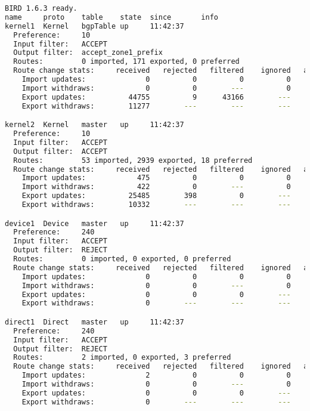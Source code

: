 \begin{lstlisting}[language=bash, caption={Birdc4 show protocols all}]
BIRD 1.6.3 ready.
name     proto    table    state  since       info
kernel1  Kernel   bgpTable up     11:42:37
  Preference:     10
  Input filter:   ACCEPT
  Output filter:  accept_zone1_prefix
  Routes:         0 imported, 171 exported, 0 preferred
  Route change stats:     received   rejected   filtered    ignored   accepted
    Import updates:              0          0          0          0          0
    Import withdraws:            0          0        ---          0          0
    Export updates:          44755          9      43166        ---       1580
    Export withdraws:        11277        ---        ---        ---        414

kernel2  Kernel   master   up     11:42:37
  Preference:     10
  Input filter:   ACCEPT
  Output filter:  ACCEPT
  Routes:         53 imported, 2939 exported, 18 preferred
  Route change stats:     received   rejected   filtered    ignored   accepted
    Import updates:            475          0          0          0        475
    Import withdraws:          422          0        ---          0        422
    Export updates:          25485        398          0        ---      25087
    Export withdraws:        10332        ---        ---        ---      10155

device1  Device   master   up     11:42:37
  Preference:     240
  Input filter:   ACCEPT
  Output filter:  REJECT
  Routes:         0 imported, 0 exported, 0 preferred
  Route change stats:     received   rejected   filtered    ignored   accepted
    Import updates:              0          0          0          0          0
    Import withdraws:            0          0        ---          0          0
    Export updates:              0          0          0        ---          0
    Export withdraws:            0        ---        ---        ---          0

direct1  Direct   master   up     11:42:37
  Preference:     240
  Input filter:   ACCEPT
  Output filter:  REJECT
  Routes:         2 imported, 0 exported, 3 preferred
  Route change stats:     received   rejected   filtered    ignored   accepted
    Import updates:              2          0          0          0          2
    Import withdraws:            0          0        ---          0          0
    Export updates:              0          0          0        ---          0
    Export withdraws:            0        ---        ---        ---          0


\end{lstlisting}
